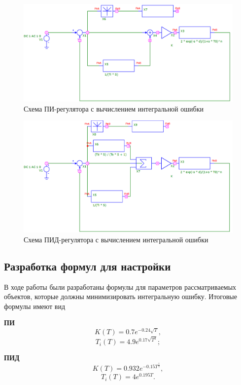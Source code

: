 \begin{figure}[H]
	\centering
	\includegraphics[scale=0.4]{./screens/schemes/pi_scheme_error.png}
	\caption{Схема ПИ-регулятора с вычислением интегральной ошибки} 
\end{figure}

\begin{figure}[H]
	\centering
	\includegraphics[scale=0.4]{./screens/schemes/pid_scheme_error.png}
	\caption{Схема ПИД-регулятора с вычислением интегральной ошибки} 
\end{figure}

\subsection{Разработка формул для настройки}
В ходе работы были разработаны формулы для параметров рассматриваемых объектов, которые должны минимизировать интегральную ошибку. Итоговые формулы имеют вид

\begin{center}
	\textbf{ПИ}
	\[K(T) = 0.7 e^{-0.24\sqrt{T}},\]
	\[T_i(T) = 4.9 e^{0.17\sqrt{T^3}};\]
\end{center}

\bigskip

\begin{center}
	\textbf{ПИД}
	\[K(T) = 0.932 e^{-0.15T^{\frac{5}{4}}},\]
	\[T_i(T) = 4 e^{0.195 T}.\]	
\end{center}

